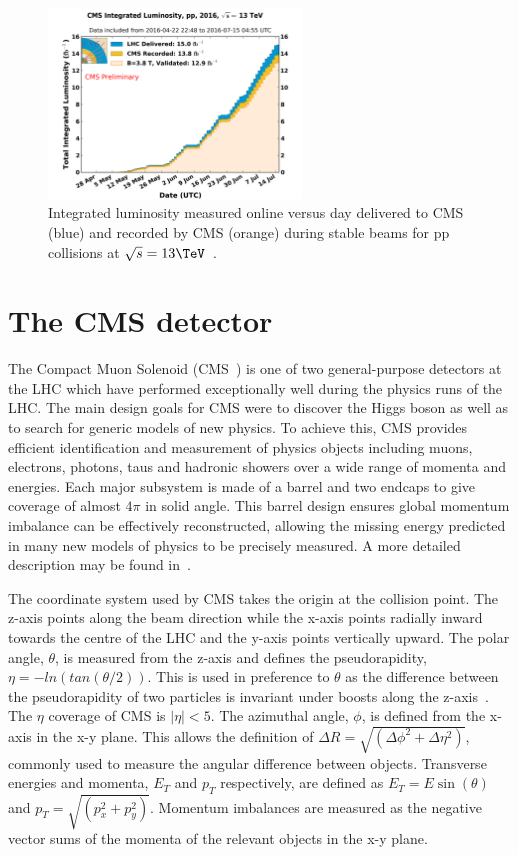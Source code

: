 \begin{figure}
\centering
    \includegraphics[width=0.6\textwidth]{./Figures/detector/int_lumi_per_day_cumulative_pp_2016_Golden_ICHEP}
  \caption{Integrated luminosity measured online versus day delivered to CMS (blue)
  and recorded by CMS (orange) during stable beams for pp collisions at $\sqrt{s} = 13 \TeV$~\cite{cmslumi}.}
  \label{fig:LHC-integrated-lumi}
\end{figure}

\section{The CMS detector}
The Compact Muon Solenoid (CMS~\cite{CMS}) is one of two general-purpose detectors at the LHC 
which have performed exceptionally well during the physics runs of the LHC. The main design goals
for CMS were to discover the Higgs boson as well as to search for generic models 
of new physics. To achieve this, CMS provides efficient identification and measurement
of physics objects including muons, electrons, photons, taus and hadronic showers over a
wide range of momenta and energies. Each major subsystem is made of a barrel
and two endcaps to give coverage of almost $4\pi$ in solid angle. 
This barrel design ensures global momentum imbalance can be effectively 
reconstructed, allowing the missing energy predicted in many new models of physics to be
precisely measured. A more detailed description may be found in~\cite{CMS}.  

The coordinate system used by CMS takes the origin at 
the collision point. The z-axis points along the beam direction while the x-axis points radially inward
towards the centre of the LHC and the y-axis points vertically upward.
The polar angle, $\theta$, is measured from the z-axis and defines the pseudorapidity, $\eta=-ln(tan(\theta/2))$. 
This is used in preference to $\theta$ as the difference between the pseudorapidity of two 
particles is invariant under boosts along the z-axis~\cite{cms_iop}. 
The $\eta$ coverage of CMS is $|\eta|<5$. The azimuthal angle, $\phi$, is defined from the x-axis in the x-y plane.
This allows the definition of $\Delta R = \sqrt{(\Delta\phi^2+\Delta\eta^2)}$, commonly used to measure the 
angular difference between objects. Transverse energies and momenta, $E_T $ and $p_T$ respectively, are defined 
as $E_T = E\sin(\theta)$ and $p_T = \sqrt{(p_{x}^2+p_{y}^2)}$. Momentum imbalances are measured as the negative 
vector sums of the momenta of the relevant objects in the x-y plane. 

